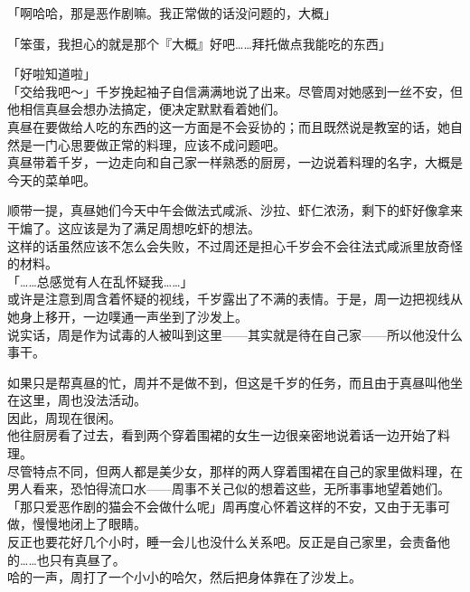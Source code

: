 「啊哈哈，那是恶作剧嘛。我正常做的话没问题的，大概」

「笨蛋，我担心的就是那个『大概』好吧……拜托做点我能吃的东西」

「好啦知道啦」\\

「交给我吧～」千岁挽起袖子自信满满地说了出来。尽管周对她感到一丝不安，但他相信真昼会想办法搞定，便决定默默看着她们。\\

真昼在要做给人吃的东西的这一方面是不会妥协的；而且既然说是教室的话，她自然是一门心思要做正常的料理，应该不成问题吧。\\

真昼带着千岁，一边走向和自己家一样熟悉的厨房，一边说着料理的名字，大概是今天的菜单吧。

顺带一提，真昼她们今天中午会做法式咸派、沙拉、虾仁浓汤，剩下的虾好像拿来干煸了。这应该是为了满足周想吃虾的想法。\\

这样的话虽然应该不怎么会失败，不过周还是担心千岁会不会往法式咸派里放奇怪的材料。\\

「……总感觉有人在乱怀疑我……」\\

或许是注意到周含着怀疑的视线，千岁露出了不满的表情。于是，周一边把视线从她身上移开，一边噗通一声坐到了沙发上。\\

说实话，周是作为试毒的人被叫到这里——其实就是待在自己家——所以他没什么事干。

如果只是帮真昼的忙，周并不是做不到，但这是千岁的任务，而且由于真昼叫他坐在这里，周也没法活动。\\

因此，周现在很闲。\\

他往厨房看了过去，看到两个穿着围裙的女生一边很亲密地说着话一边开始了料理。\\

尽管特点不同，但两人都是美少女，那样的两人穿着围裙在自己的家里做料理，在男人看来，恐怕得流口水——周事不关己似的想着这些，无所事事地望着她们。\\

「那只爱恶作剧的猫会不会做什么呢」周再度心怀着这样的不安，又由于无事可做，慢慢地闭上了眼睛。\\

反正也要花好几个小时，睡一会儿也没什么关系吧。反正是自己家里，会责备他的……也只有真昼了。\\

哈的一声，周打了一个小小的哈欠，然后把身体靠在了沙发上。
